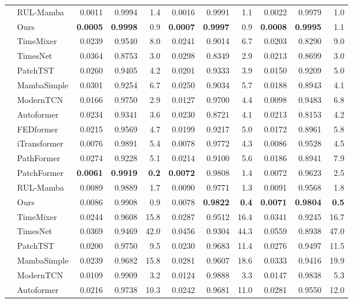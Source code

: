 \begin{table}[!t]
\begin{tabular}{@{}ll rrr rrr rrr@{}}
  & RUL-Mamba & 0.0011 &0.9994&1.4& 0.0016 &0.9991&1.1& 0.0022 &0.9979&1.0 \\
  & Ours &\textbf{0.0005}&\textbf{0.9998}&0.9&\textbf{0.0007}&\textbf{0.9997}&0.9&\textbf{0.0008}&\textbf{0.9995}&1.1 \\
\midrule
{} & TimeMixer & 0.0239 &0.9540&8.0& 0.0241 &0.9014&6.7& 0.0203 &0.8290&9.0 \\
  & TimesNet & 0.0364 &0.8753&3.0& 0.0298 &0.8349&2.9& 0.0213 &0.8699&3.0 \\
  & PatchTST & 0.0260 &0.9405&4.2& 0.0201 &0.9333&3.9& 0.0150 &0.9209&5.0 \\
  & MambaSimple & 0.0301 &0.9254&6.7& 0.0250 &0.9034&5.7& 0.0188 &0.8943&4.1 \\
  & ModernTCN & 0.0166 &0.9750&2.9& 0.0127 &0.9700&4.4& 0.0098 &0.9483&6.8 \\
  & Autoformer & 0.0234 &0.9341&3.6& 0.0230 &0.8721&4.1& 0.0213 &0.8153&4.2 \\
  & FEDformer & 0.0215 &0.9569&4.7& 0.0199 &0.9217&5.0& 0.0172 &0.8961&5.8 \\
  & iTransformer & 0.0076 &0.9891&5.4& 0.0078 &0.9772&4.3& 0.0086 &0.9528&4.5 \\
  & PathFormer & 0.0274 &0.9228&5.1& 0.0214 &0.9100&5.6& 0.0186 &0.8941&7.9 \\
  & PatchFormer & \textbf{0.0061} &\textbf{0.9919}&\textbf{0.2}& \textbf{0.0072} &0.9808&1.4& 0.0072 &0.9623&2.5 \\
  & RUL-Mamba & 0.0089 &0.9889&1.7& 0.0090 &0.9771&1.3& 0.0091 &0.9568&1.8 \\
  & Ours &0.0086&0.9908&0.9&0.0078&\textbf{0.9822}&\textbf{0.4}&\textbf{0.0071}&\textbf{0.9804}&\textbf{0.5} \\
\midrule
{} & TimeMixer & 0.0244 &0.9608&15.8& 0.0287 &0.9512&16.4& 0.0341 &0.9245&16.7 \\
  & TimesNet & 0.0369 &0.9469&42.0& 0.0456 &0.9304&44.3& 0.0559 &0.8938&47.0 \\
  & PatchTST & 0.0200 &0.9750&9.5& 0.0230 &0.9683&11.4& 0.0276 &0.9497&11.5 \\
  & MambaSimple & 0.0239 &0.9682&15.8& 0.0281 &0.9607&18.6& 0.0333 &0.9416&19.9 \\
  & ModernTCN & 0.0109 &0.9909&3.2& 0.0124 &0.9888&3.3& 0.0147 &0.9838&5.3 \\
  & Autoformer & 0.0216 &0.9738&10.3& 0.0242 &0.9681&11.0& 0.0281 &0.9550&12.0 \\

\end{tabular}
\end{table}
